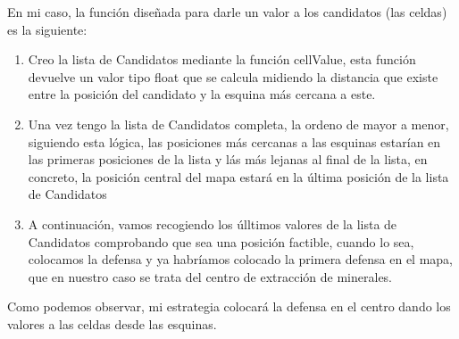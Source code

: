 En mi caso, la función diseñada para darle un valor a los candidatos (las celdas) es la siguiente: 
\begin{enumerate}
    \item Creo la lista de Candidatos mediante la función cellValue, esta función devuelve un valor tipo float que se calcula midiendo la distancia que existe entre la posición del candidato y la esquina más cercana a este.
    \item Una vez tengo la lista de Candidatos completa, la ordeno de mayor a menor, siguiendo esta lógica, las posiciones más cercanas a las esquinas estarían en las primeras posiciones de la lista y lás más lejanas al final de la lista, en concreto, la posición central del mapa estará en la última posición de la lista de Candidatos
    \item A continuación, vamos recogiendo los úlltimos valores de la lista de Candidatos comprobando que sea una posición factible, cuando lo sea, colocamos la defensa y ya habríamos colocado la primera defensa en el mapa, que en nuestro caso se trata del centro de extracción de minerales.
\end{enumerate}

Como podemos observar, mi estrategia colocará la defensa en el centro dando los valores a las celdas desde las esquinas.




